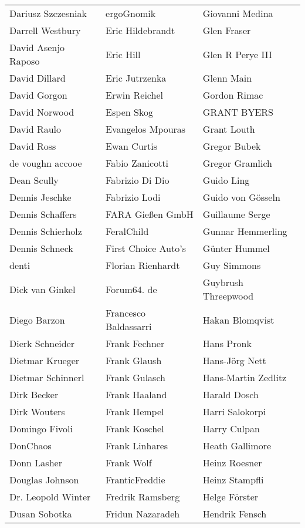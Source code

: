 \begin{tabular}{p{4.5cm}p{4.5cm}p{4.5cm}}
Dariusz Szczesniak & ergoGnomik & Giovanni Medina \\
Darrell Westbury & Eric Hildebrandt & Glen Fraser \\
David Asenjo Raposo & Eric Hill & Glen R Perye III \\
David Dillard & Eric Jutrzenka & Glenn Main \\
David Gorgon & Erwin Reichel & Gordon Rimac \\
David Norwood & Espen Skog & GRANT BYERS \\
David Raulo & Evangelos Mpouras & Grant Louth \\
David Ross & Ewan Curtis & Gregor Bubek \\
de voughn accooe & Fabio Zanicotti & Gregor Gramlich \\
Dean Scully & Fabrizio Di Dio & Guido Ling \\
Dennis Jeschke & Fabrizio Lodi & Guido von Gösseln \\
Dennis Schaffers & FARA Gießen GmbH & Guillaume Serge \\
Dennis Schierholz & FeralChild & Gunnar Hemmerling \\
Dennis Schneck & First Choice Auto's & Günter Hummel \\
denti & Florian Rienhardt & Guy Simmons \\
Dick van Ginkel & Forum64. de & Guybrush Threepwood \\
Diego Barzon & Francesco Baldassarri & Hakan Blomqvist \\
Dierk Schneider & Frank Fechner & Hans Pronk \\
Dietmar Krueger & Frank Glaush & Hans-Jörg Nett \\
Dietmar Schinnerl & Frank Gulasch & Hans-Martin Zedlitz \\
Dirk Becker & Frank Haaland & Harald Dosch \\
Dirk Wouters & Frank Hempel & Harri Salokorpi \\
Domingo Fivoli & Frank Koschel & Harry Culpan \\
DonChaos & Frank Linhares & Heath Gallimore \\
Donn Lasher & Frank Wolf & Heinz Roesner \\
Douglas Johnson & FranticFreddie & Heinz Stampfli \\
Dr. Leopold Winter & Fredrik Ramsberg & Helge Förster \\
Dusan Sobotka & Fridun Nazaradeh & Hendrik Fensch \\

\end{tabular}

